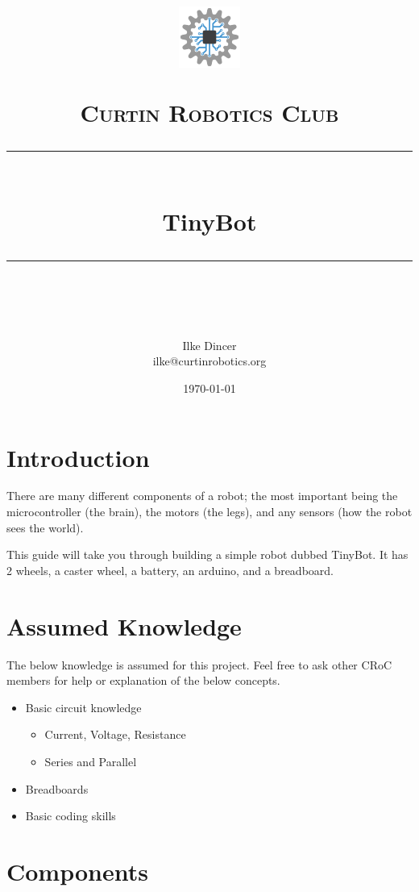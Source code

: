 \documentclass[a4paper,12pt]{article}
\title{	
    \begin{center}
        \includegraphics[width=0.15\textwidth]{CRoCLogo(mediumquality).png}
    \end{center}
	\normalfont\normalsize
	\textsc{Curtin Robotics Club}\\ %
	\vspace{25pt} %
	\rule{\linewidth}{0.5pt}\\ %
	\vspace{20pt} %
    {\huge TinyBot }\\
	\vspace{12pt} %
	\rule{\linewidth}{2pt}\\ %
	\vspace{12pt} %
}
\author{\LARGE Ilke Dincer \\ \small ilke@curtinrobotics.org} %
\date{\normalsize\today} %
\begin{document}
\maketitle

\pagebreak
{}
\tableofcontents

\pagebreak
{}

\section{Introduction}

There are many different components of a robot; the most important being the microcontroller (the brain), the motors (the legs), and any sensors (how the robot sees the world).

This guide will take you through building a simple robot dubbed TinyBot. It has 2 wheels, a caster wheel, a battery, an arduino, and a breadboard.

\section{Assumed Knowledge}

The below knowledge is assumed for this project. Feel free to ask other CRoC members for help or explanation of the below concepts.


\begin{itemize}
    \item Basic circuit knowledge
    \begin{itemize}
        \item Current, Voltage, Resistance
        \item Series and Parallel
    \end{itemize}
    \item Breadboards
    \item Basic coding skills
\end{itemize}

\section{Components}
 
\end{document}
